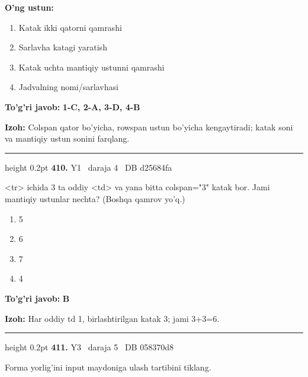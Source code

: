 \documentclass[10pt,a4paper,oneside]{article}
\begin{document}
\textbf{\footnotesize O'ng ustun:}
\begin{enumerate}[label=\Alph*),leftmargin=9mm]
\item Katak ikki qatorni qamrashi
\item Sarlavha katagi yaratish
\item Katak uchta mantiqiy ustunni qamrashi
\item Jadvalning nomi/sarlavhasi
\end{enumerate}
\begin{tcolorbox}[enhanced,breakable,colback=teal!4,colframe=teal!45!black,boxrule=0.45pt,arc=1.2mm,left=2.8mm,right=2.8mm,top=2mm,bottom=2mm,before skip=2mm,after skip=2mm]
\textbf{\color{teal}To'g'ri javob:} \textbf{1-C, 2-A, 3-D, 4-B}
\par\smallskip
\textbf{Izoh:} Colspan qator bo'yicha, rowspan ustun bo'yicha kengaytiradi; katak soni va mantiqiy ustun sonini farqlang.
\end{tcolorbox}
\vspace{2mm}\hrule height 0.2pt \vspace{4mm}
\hypertarget{q410}{\textbf{\color{ink}410.}}  {\color{muted}\scriptsize Y1 \textbullet\ daraja 4 \textbullet\ DB d25684fa}
\par
\textless{}tr\textgreater{} ichida 3 ta oddiy \textless{}td\textgreater{} va yana bitta colspan="3" katak bor. Jami mantiqiy ustunlar nechta? (Boshqa qamrov yo'q.)
\begin{enumerate}[label=\Alph*),leftmargin=9mm]
\item 5
\item 6
\item 7
\item 4
\end{enumerate}
\begin{tcolorbox}[enhanced,breakable,colback=teal!4,colframe=teal!45!black,boxrule=0.45pt,arc=1.2mm,left=2.8mm,right=2.8mm,top=2mm,bottom=2mm,before skip=2mm,after skip=2mm]
\textbf{\color{teal}To'g'ri javob:} \textbf{B}
\par\smallskip
\textbf{Izoh:} Har oddiy td 1, birlashtirilgan katak 3; jami 3+3=6.
\end{tcolorbox}
\vspace{2mm}\hrule height 0.2pt \vspace{4mm}
\hypertarget{q411}{\textbf{\color{ink}411.}}  {\color{muted}\scriptsize Y3 \textbullet\ daraja 5 \textbullet\ DB 058370d8}
\par
Forma yorlig'ini input maydoniga ulash tartibini tiklang.
\end{document}
